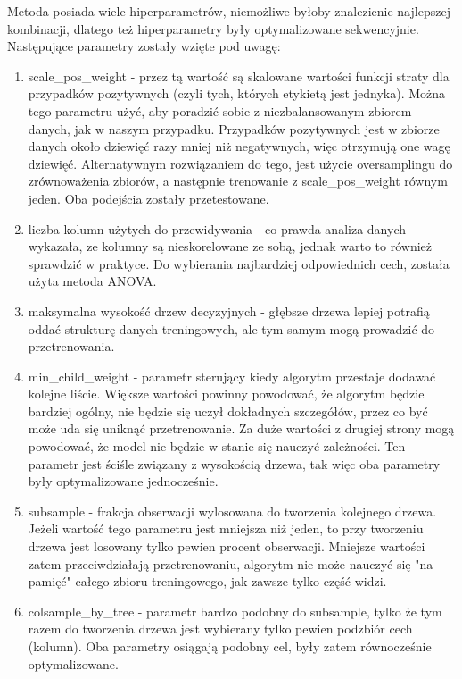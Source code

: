 \documentclass[12pt]{article}
\begin{document}
Metoda posiada wiele hiperparametrów, niemożliwe byłoby znalezienie najlepszej kombinacji, dlatego też hiperparametry były optymalizowane sekwencyjnie. Następujące parametry zostały wzięte pod uwagę:

\begin{enumerate}
    \item scale\_pos\_weight - przez tą wartość są skalowane wartości funkcji straty dla przypadków pozytywnych (czyli tych, których etykietą jest jednyka). Można tego parametru użyć, aby poradzić sobie z niezbalansowanym zbiorem danych, jak w naszym przypadku. Przypadków pozytywnych jest w zbiorze danych około dziewięć razy mniej niż negatywnych, więc otrzymują one wagę dziewięć. Alternatywnym rozwiązaniem do tego, jest użycie oversamplingu do zrównoważenia zbiorów, a następnie trenowanie z scale\_pos\_weight równym jeden. Oba podejścia zostały przetestowane.
    
    \item liczba kolumn użytych do przewidywania - co prawda analiza danych wykazała, ze kolumny są nieskorelowane ze sobą, jednak warto to również sprawdzić w praktyce. Do wybierania najbardziej odpowiednich cech, została użyta metoda ANOVA.
    
    \item maksymalna wysokość drzew decyzyjnych - głębsze drzewa lepiej potrafią oddać strukturę danych treningowych, ale tym samym mogą prowadzić do przetrenowania.
    
    \item min\_child\_weight - parametr sterujący kiedy algorytm przestaje dodawać kolejne liście. Większe wartości powinny powodować, że algorytm będzie bardziej ogólny, nie będzie się uczył dokładnych szczegółów, przez co być może uda się uniknąć przetrenowanie. Za duże wartości z drugiej strony mogą powodować, że model nie będzie w stanie się nauczyć zależności. Ten parametr jest ściśle związany z wysokością drzewa, tak więc oba parametry były optymalizowane jednocześnie. 
    
    \item subsample - frakcja obserwacji wylosowana do tworzenia kolejnego drzewa. Jeżeli wartość tego parametru jest mniejsza niż jeden, to przy tworzeniu drzewa jest losowany tylko pewien procent obserwacji. Mniejsze wartości zatem przeciwdziałają przetrenowaniu, algorytm nie może nauczyć się "na pamięć" całego zbioru treningowego, jak zawsze tylko część widzi.
    
    \item colsample\_by\_tree - parametr bardzo podobny do subsample, tylko że tym razem do tworzenia drzewa jest wybierany tylko pewien podzbiór cech (kolumn). Oba parametry osiągają podobny cel, były zatem równocześnie optymalizowane.
    

\end{enumerate}
\end{document}
